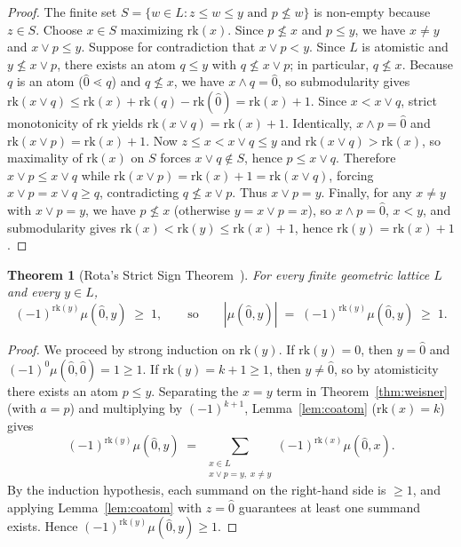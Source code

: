 \documentclass[11pt]{article}
\newtheorem{theorem}{Theorem}[section]
\theoremstyle{definition}
\theoremstyle{remark}
\newcommand{\rk}{\mathrm{rk}}
\newcommand{\hatzero}{\hat{0}}
\begin{document}
\begin{proof}
The finite set $S = \{w \in L : z \le w \le y \text{ and } p \not\le w\}$ is non-empty because $z \in S$. Choose $x \in S$ maximizing $\rk(x)$. Since $p \not\le x$ and $p \le y$, we have $x \neq y$ and $x \vee p \le y$. Suppose for contradiction that $x \vee p < y$. Since $L$ is atomistic and $y \not\le x \vee p$, there exists an atom $q \le y$ with $q \not\le x \vee p$; in particular, $q \not\le x$. Because $q$ is an atom ($\hatzero \lessdot q$) and $q \not\le x$, we have $x \wedge q = \hatzero$, so submodularity gives $\rk(x \vee q) \le \rk(x) + \rk(q) - \rk(\hatzero) = \rk(x) + 1$. Since $x < x \vee q$, strict monotonicity of $\rk$ yields $\rk(x \vee q) = \rk(x) + 1$. Identically, $x \wedge p = \hatzero$ and $\rk(x \vee p) = \rk(x) + 1$. Now $z \le x < x \vee q \le y$ and $\rk(x \vee q) > \rk(x)$, so maximality of $\rk(x)$ on $S$ forces $x \vee q \notin S$, hence $p \le x \vee q$. Therefore $x \vee p \le x \vee q$ while $\rk(x \vee p) = \rk(x) + 1 = \rk(x \vee q)$, forcing $x \vee p = x \vee q \ge q$, contradicting $q \not\le x \vee p$. Thus $x \vee p = y$. Finally, for any $x \neq y$ with $x \vee p = y$, we have $p \not\le x$ (otherwise $y = x \vee p = x$), so $x \wedge p = \hatzero$, $x < y$, and submodularity gives $\rk(x) < \rk(y) \le \rk(x) + 1$, hence $\rk(y) = \rk(x) + 1$.
\end{proof}

\begin{theorem}[Rota's Strict Sign Theorem~\cite{Rota1964}]
\label{thm:rota}
For every finite geometric lattice $L$ and every $y \in L$,
\[
  (-1)^{\rk(y)} \mu(\hatzero, y) \;\ge\; 1, \qquad \text{so} \qquad |\mu(\hatzero, y)| \;=\; (-1)^{\rk(y)} \mu(\hatzero, y) \;\ge\; 1.
\]
\end{theorem}

\begin{proof}
We proceed by strong induction on $\rk(y)$. If $\rk(y) = 0$, then $y = \hatzero$ and $(-1)^0 \mu(\hatzero, \hatzero) = 1 \ge 1$. If $\rk(y) = k + 1 \ge 1$, then $y \neq \hatzero$, so by atomisticity there exists an atom $p \le y$. Separating the $x = y$ term in Theorem~\ref{thm:weisner} (with $a = p$) and multiplying by $(-1)^{k+1}$, Lemma~\ref{lem:coatom} ($\rk(x) = k$) gives
\begin{equation}
\label{eq:signed-weisner}
  (-1)^{\rk(y)} \mu(\hatzero, y) \;=\; \sum_{\substack{x \in L \\ x \vee p = y,\; x \neq y}} (-1)^{\rk(x)} \mu(\hatzero, x).
\end{equation}
By the induction hypothesis, each summand on the right-hand side is $\ge 1$, and applying Lemma~\ref{lem:coatom} with $z = \hatzero$ guarantees at least one summand exists. Hence $(-1)^{\rk(y)} \mu(\hatzero, y) \ge 1$.
\end{proof}
\end{document}
